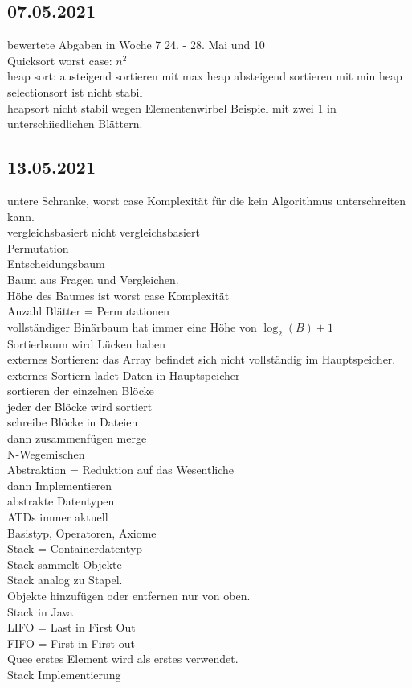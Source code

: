 \documentclass{article}
\begin{document}
	\subsection*{07.05.2021}
	bewertete Abgaben in Woche 7 24. - 28. Mai und 10 \\
	Quicksort worst case: $n^2$ \\
	heap sort: austeigend sortieren mit max heap absteigend sortieren mit min heap \\
	selectionsort ist nicht stabil \\
	heapsort nicht stabil wegen Elementenwirbel Beispiel mit zwei 1 in unterschiiedlichen Blättern. \\
	\subsection*{13.05.2021}
	untere Schranke, worst case Komplexität für die kein Algorithmus unterschreiten kann. \\
	vergleichsbasiert nicht vergleichsbasiert \\
	Permutation \\
	Entscheidungsbaum \\
	Baum aus Fragen und Vergleichen. \\
	Höhe des Baumes ist worst case Komplexität \\
	Anzahl Blätter = Permutationen \\
	vollständiger Binärbaum hat immer eine Höhe von $\log_2(B)+1$ \\
	Sortierbaum wird Lücken haben \\
	externes Sortieren: das Array befindet sich nicht vollständig im Hauptspeicher. \\
	externes Sortiern ladet Daten in Hauptspeicher \\
	sortieren der einzelnen Blöcke \\
	jeder der Blöcke wird sortiert \\
	schreibe Blöcke in Dateien \\
	dann zusammenfügen merge\\
	N-Wegemischen \\
	Abstraktion = Reduktion auf das Wesentliche \\
	dann Implementieren \\
	abstrakte Datentypen \\
	ATDs immer aktuell \\
	Basistyp, Operatoren, Axiome \\
	Stack = Containerdatentyp \\
	Stack sammelt Objekte \\
	Stack analog zu Stapel. \\
	Objekte hinzufügen oder entfernen nur von oben. \\
	Stack in Java \\
	LIFO = Last in First Out \\
	FIFO = First in First out \\
	Quee erstes Element wird als erstes verwendet. \\
 	Stack Implementierung \\
\end{document}

